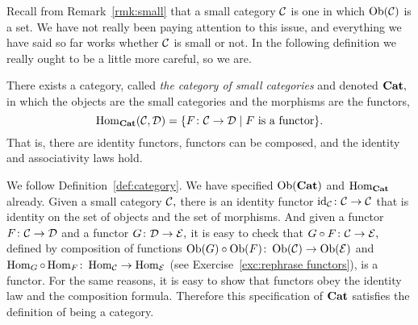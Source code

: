 \documentclass[../main/CT4S-EN-RU]{subfiles}
\begin{document}
\begin{remarkRUS}
\end{remarkRUS}


\subsubsection{}\label{sec:cat of cats}

\begin{blockENG}
Recall from Remark~\ref{rmk:small} that a small category $\mathcal{C}$ is one in which $\operatorname{Ob}(\mathcal{C})$ is a set. We have not really been paying attention to this issue, and everything we have said so far works whether $\mathcal{C}$ is small or not. In the following definition we really ought to be a little more careful, so we are. 
\end{blockENG}

\begin{blockRUS}
\end{blockRUS}

\begin{propositionENG}
There exists a category, called {\em the category of small categories} and denoted ${\mathbf{Cat}},$ in which the objects are the small categories and the morphisms are the functors, $$\operatorname{Hom}_{\mathbf{Cat}}(\mathcal{C},\mathcal{D})=\{F\colon\mathcal{C}\rightarrow\mathcal{D}{\;|\;} F \textnormal{ is a functor}\}.$$ That is, there are identity functors, functors can be composed, and the identity and associativity laws hold.
\end{propositionENG}

\begin{propositionRUS}
\end{propositionRUS}

\begin{proofENG}
We follow Definition~\ref{def:category}. We have specified $\operatorname{Ob}({\mathbf{Cat}})$ and $\operatorname{Hom}_{\mathbf{Cat}}$ already. Given a small category $\mathcal{C},$ there is an identity functor $\operatorname{id}_\mathcal{C}\colon\mathcal{C}\rightarrow\mathcal{C}$ that is identity on the set of objects and the set of morphisms. And given a functor $F\colon\mathcal{C}\rightarrow\mathcal{D}$ and a functor $G\colon\mathcal{D}\rightarrow\mathcal{E},$ it is easy to check that $G\circ F\colon \mathcal{C}\rightarrow\mathcal{E},$ defined by composition of functions $\operatorname{Ob}(G)\circ\operatorname{Ob}(F)\colon\operatorname{Ob}(\mathcal{C})\rightarrow\operatorname{Ob}(\mathcal{E})$ and $\operatorname{Hom}_G\circ\operatorname{Hom}_F\colon\operatorname{Hom}_\mathcal{C}\rightarrow\operatorname{Hom}_\mathcal{E}$ (see Exercise~\ref{exc:rephrase functors}), is a functor. For the same reasons, it is easy to show that functors obey the identity law and the composition formula. Therefore this specification of ${\mathbf{Cat}}$ satisfies the definition of being a category. 
\end{proofENG}
\end{document}
